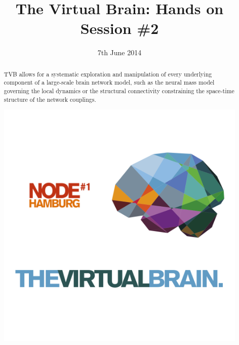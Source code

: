 \documentclass{tufte-handout}
\title{The Virtual Brain: Hands on Session \#2}
\date{7th June 2014}
\begin{document}
\maketitle %

\begin{abstract}

\noindent TVB allows for a systematic exploration and manipulation of every
underlying component of a large-scale brain network model, such as the neural
mass model governing the local dynamics or the structural connectivity
constraining the space-time structure of the network couplings.
\begin{marginfigure}%
  \includegraphics[width=\linewidth]{tvb_logo_transparent_square}
  \label{fig:marginfig}
\end{marginfigure}
\end{abstract}


\end{document}
